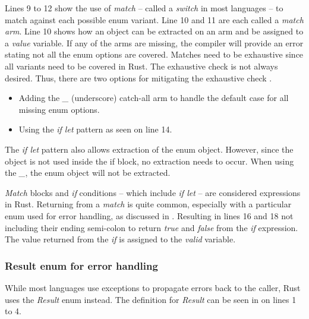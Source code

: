 
Lines 9 to 12 show the use of \textit{match} -- called a \textit{switch} in most languages -- to match against each possible enum variant.
Line 10 and 11 are each called a \textit{match arm}.
Line 10 shows how an object can be extracted on an arm and be assigned to a \textit{value} variable.
If any of the arms are missing, the compiler will provide an error stating not all the enum options are covered.
Matches need to be exhaustive since all variants need to be covered in Rust.
The exhaustive check is not always desired.
Thus, there are two options for mitigating the exhaustive check \cite{klabnik_2019_01}.

\begin{itemize}
	\item Adding the \textit{\_} (underscore) catch-all arm to handle the default case for all missing enum options.
	\item Using the \textit{if let} pattern as seen on line 14.
\end{itemize}

The \textit{if let} pattern also allows extraction of the enum object.
However, since the object is not used inside the if block, no extraction needs to occur.
When using the \textit{\_}, the enum object will not be extracted.

\textit{Match} blocks and \textit{if} conditions -- which include \textit{if let} -- are considered expressions in Rust.
Returning from a \textit{match} is quite common, especially with a particular enum used for error handling, as discussed in .
Resulting in lines 16 and 18 not including their ending semi-colon to return \textit{true} and \textit{false} from the \textit{if} expression.
The value returned from the \textit{if} is assigned to the \textit{valid} variable.

\subsubsection{Result enum for error handling}
\label{sec:result-enum}
While most languages use exceptions to propagate errors back to the caller, Rust uses the \textit{Result} enum instead.
The definition for \textit{Result} can be seen in  on lines 1 to 4.


